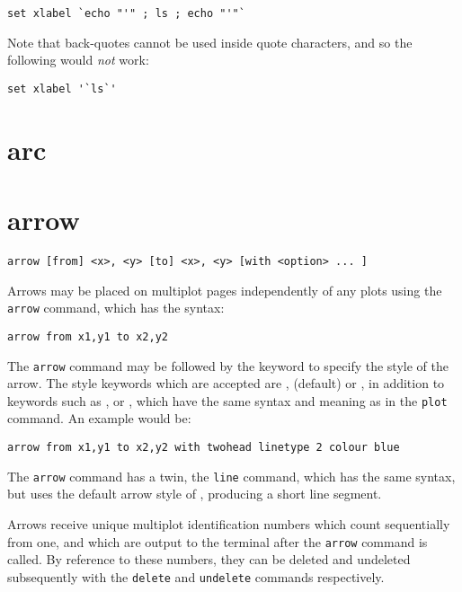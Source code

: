 \begin{verbatim}
set xlabel `echo "'" ; ls ; echo "'"`
\end{verbatim}

\noindent Note that back-quotes cannot be used inside quote characters, and so
the following would \textit{not} work:

\begin{verbatim}
set xlabel '`ls`'
\end{verbatim}


\section{arc}


\section{arrow}

\begin{verbatim}
arrow [from] <x>, <y> [to] <x>, <y> [with <option> ... ]
\end{verbatim}

Arrows may be placed on multiplot pages independently of any plots using the
{\tt arrow} command, which has the syntax:

\begin{verbatim}
arrow from x1,y1 to x2,y2
\end{verbatim}

The {\tt arrow} command may be followed by the  keyword to
specify the style of the arrow. The style keywords which are accepted are
,  (default) or , in addition to
keywords such as ,  or ,
which have the same syntax and meaning as in the {\tt plot} command. An example
would be:

\begin{verbatim}
arrow from x1,y1 to x2,y2 with twohead linetype 2 colour blue
\end{verbatim}

The {\tt arrow} command has a twin, the {\tt line} command, which has the same
syntax, but uses the default arrow style of , producing a short
line segment.

Arrows receive unique multiplot identification numbers which count sequentially
from one, and which are output to the terminal after the {\tt arrow} command is
called. By reference to these numbers, they can be deleted and undeleted
subsequently with the {\tt delete} and {\tt undelete} commands respectively.


